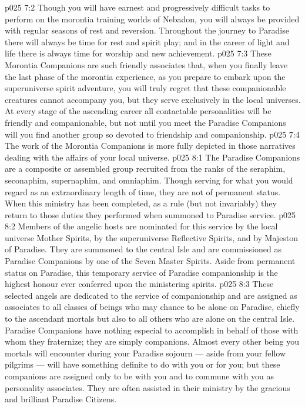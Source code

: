 \vs p025 7:2 Though you will have earnest and progressively difficult tasks to perform on the morontia training worlds of Nebadon, you will always be provided with regular seasons of rest and reversion. Throughout the journey to Paradise there will always be time for rest and spirit play; and in the career of light and life there is always time for worship and new achievement.
\vs p025 7:3 These Morontia Companions are such friend\-ly associates that, when you finally leave the last phase of the morontia experience, as you prepare to embark upon the superuniverse spirit adventure, you will truly regret that these companionable creatures cannot accompany you, but they serve exclusively in the local universes. At every stage of the ascending career all contactable personalities will be friendly and companionable, but not until you meet the Paradise Companions will you find another group so devoted to friendship and companionship.
\vs p025 7:4 The work of the Morontia Companions is more fully depicted in those narratives dealing with the affairs of your local universe.
\vs p025 8:1 The Paradise Companions are a composite or assembled group recruited from the ranks of the seraphim, seconaphim, supernaphim, and omniaphim. Though serving for what you would regard as an extraordinary length of time, they are not of permanent status. When this ministry has been completed, as a rule (but not invariably) they return to those duties they performed when summoned to Paradise service.
\vs p025 8:2 Members of the angelic hosts are nominated for this service by the local universe Mother Spirits, by the superuniverse Reflective Spirits, and by Majeston of Paradise. They are summoned to the central Isle and are commissioned as Paradise Companions by one of the Seven Master Spirits. Aside from permanent status on Paradise, this temporary service of Paradise companionship is the highest honour ever conferred upon the ministering spirits.
\vs p025 8:3 These selected angels are dedicated to the service of companionship and are assigned as associates to all classes of beings who may chance to be alone on Paradise, chiefly to the ascendant mortals but also to all others who are alone on the central Isle. Paradise Companions have nothing especial to accomplish in behalf of those with whom they fraternize; they are simply companions. Almost every other being you mortals will encounter during your Paradise sojourn --- aside from your fellow pilgrims --- will have something definite to do with you or for you; but these companions are assigned only to be with you and to commune with you as personality associates. They are often assisted in their ministry by the gracious and brilliant Paradise Citizens.
